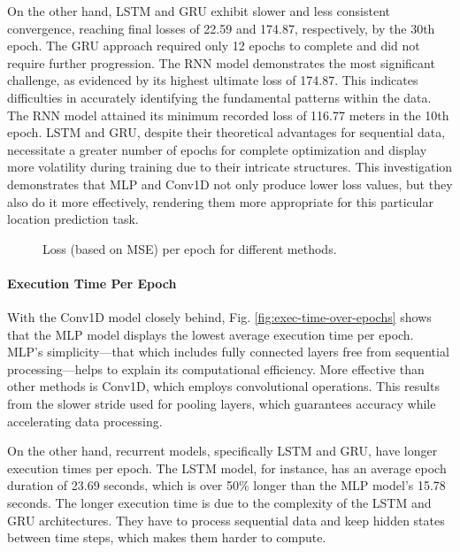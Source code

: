 \documentclass[conference]{IEEEtran}
\begin{document}
{On the other hand, LSTM and GRU exhibit slower and less consistent convergence, reaching final losses of 22.59 and 174.87, respectively, by the 30th epoch. The GRU approach required only 12 epochs to complete and did not require further progression. The RNN model demonstrates the most significant challenge, as evidenced by its highest ultimate loss of 174.87. This indicates difficulties in accurately identifying the fundamental patterns within the data. The RNN model attained its minimum recorded loss of 116.77 meters in the 10th epoch. LSTM and GRU, despite their theoretical advantages for sequential data, necessitate a greater number of epochs for complete optimization and display more volatility during training due to their intricate structures. This investigation demonstrates that MLP and Conv1D not only produce lower loss values, but they also do it more effectively, rendering them more appropriate for this particular location prediction task.

\begin{figure}
        \centering
        
        \caption{Loss (based on MSE) per epoch for different methods.}
        \label{fig:loss-over-epochs}
        \vspace{-4mm}
\end{figure}

\paragraph{Execution Time Per Epoch}
With the Conv1D model closely behind, Fig. \ref{fig:exec-time-over-epochs} shows that the MLP model displays the lowest average execution time per epoch. MLP's simplicity—that which includes fully connected layers free from sequential processing—helps to explain its computational efficiency. More effective than other methods is Conv1D, which employs convolutional operations. This results from the slower stride used for pooling layers, which guarantees accuracy while accelerating data processing.

On the other hand, recurrent models, specifically LSTM and GRU, have longer execution times per epoch. The LSTM model, for instance, has an average epoch duration of 23.69 seconds, which is over 50\% longer than the MLP model's 15.78 seconds. The longer execution time is due to the complexity of the LSTM and GRU architectures. They have to process sequential data and keep hidden states between time steps, which makes them harder to compute.

}
\end{document}
